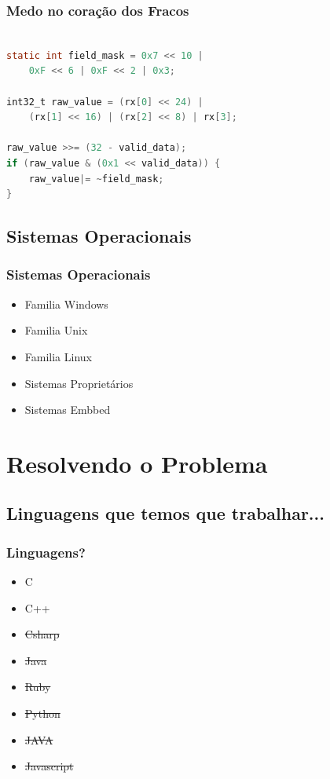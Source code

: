 \documentclass{beamer}
\begin{document}
\begin{frame}[fragile] \frametitle{Medo no coração dos Fracos}
    \begin{lstlisting}[language=C]

static int field_mask = 0x7 << 10 |
    0xF << 6 | 0xF << 2 | 0x3;

int32_t raw_value = (rx[0] << 24) |
    (rx[1] << 16) | (rx[2] << 8) | rx[3];

raw_value >>= (32 - valid_data);
if (raw_value & (0x1 << valid_data)) {
    raw_value|= ~field_mask;
}

    \end{lstlisting}
\end{frame}

\subsection{Sistemas Operacionais}

\begin{frame} \frametitle{Sistemas Operacionais}
 \begin{itemize}
  \item Familia Windows
  \item Familia Unix
  \item Familia Linux
  \item Sistemas Proprietários
  \item Sistemas Embbed
 \end{itemize}
\end{frame}

\section { Resolvendo o Problema }

\subsection{Linguagens que temos que trabalhar...}
\begin{frame} \frametitle{Linguagens?}
 \begin{itemize}
  \item C
  \item C++
  \item \st{Csharp}
  \item \st{Java}
  \item \st{Ruby}
  \item \st{Python}
  \item \st{JAVA}
  \item \st{Javascript}
 \end{itemize}
\end{frame}
\end{document}
